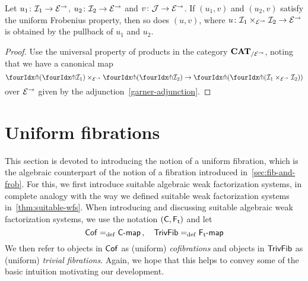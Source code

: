 \documentclass[reqno,10pt,a4paper,oneside,draft]{amsart}
\begin{document}
{{\begin{proposition} \label{uniform-frobenius-product-u} Let $u_1 \co \cal{I}_1 \to \cal{E}^\to$, $u_2 \co \cal{I}_2 \to \cal{E}^\to$ and
$v \co \cal{J} \to \cal{E}^\to$. If $(u_1, v)$ and $(u_2, v)$ satisfy the uniform Frobenius property, then so does $(u, v)$, where 
$u \co \cal{I}_1 \times_{\cal{E}^\to} \cal{I}_2 \to \cal{E}^\to$ is obtained by the pullback of $u_1$ and $u_2$.
\end{proposition}

\begin{proof}
Use the universal property of products in the category $\CAT_{/\cal{E}^\to}$, noting that we have a canonical map
\[
\liftl{(\liftr{\cal{I}_1})} \times_{\cal{E}^\to} \liftl{(\liftr{\cal{I}_2})} \to \liftl{(\liftr{(\cal{I}_1 \times_{\cal{E}^\to} \cal{I}_2)})}
\]
over $\cal{E}^\to$ given by the adjunction~\eqref{garner-adjunction}.
\end{proof}





\section{Uniform fibrations}
\label{sec:unif}





 This section is devoted to introducing the notion of a uniform fibration, which is the algebraic counterpart of the notion of a fibration
introduced in~\cref{sec:fib-and-frob}. For this, we first introduce suitable algebraic weak factorization systems, in complete analogy with
the way we defined suitable weak factorization systems in~\cref{thm:suitable-wfs}. When introducing and discussing suitable algebraic
weak factorization systems, we use the notation $(\CC, \TF)$ and let
\[
  \Cof \defeq \pcoalg{\CC} \, , \quad \TrivFib \defeq \palg{\TF}
  \]
We then refer to objects in $\Cof$ as (uniform) \emph{cofibrations} and objects in $\TrivFib$ as (uniform) \emph{trivial fibrations}.
Again, we hope that this helps to convey some of the basic intuition motivating our development.  

}}
\end{document}
